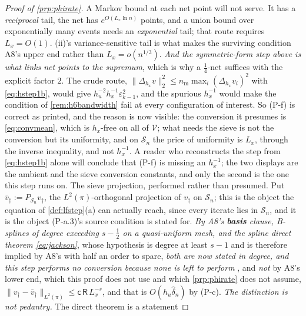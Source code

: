 \begin{proof}[Proof of \cref{prp:phirate}]
A Markov bound at each net point will not serve. It has a \emph{reciprocal} tail, the net has
$e^{O(L_x\ln n)}$ points, and a union bound over
exponentially many events needs an \emph{exponential} tail; that route requires $L_x=O(1)$.
(ii)'s variance-sensitive tail is what makes the surviving condition
A8's upper end rather than $L_x=o(n^{1/3})$. \emph{And the symmetric-form step above is what links net
points to the supremum}, which is why a $\tfrac14$-net suffices with the explicit factor $2$.
The crude route, $\|\Delta_{h_x}v\|_2^{2}\le n_{\mathrm m}\max_i(\Delta_{h_x}v_i)^{2}$ with
\eqref{eq:hstep1b}, would give $h_u^{-2}h_x^{-1}\varepsilon_{k-1}^{2}$, and the spurious $h_x^{-1}$ would
make the condition of \cref{rem:h6bandwidth} fail at every configuration of interest. So (P-f) is
correct as printed, and the reason is now visible: the conversion it presumes is \eqref{eq:convmean},
which is $h_x$-free on all of $\mathcal V$; what needs the sieve is not the conversion but its
uniformity, and on $\mathcal S_n$ the price of uniformity is $L_x$, through the inverse inequality, 
and not $h_x^{-1}$. A reader who reconstructs the step from \eqref{eq:hstep1b} alone will conclude
that (P-f) is missing an $h_x^{-1}$; the two displays are the ambient and the sieve conversion constants,
and only the second is the one this step runs on.
The sieve projection, performed rather than presumed. Put $\bar v_\dagger:=P_{\mathcal S_n}v_\dagger$,
the $L^{2}(\pi)$-orthogonal projection of $v_\dagger$ on $\mathcal S_n$; this is the object the equation
of \cref{def:lfstep}(a) can actually reach, since every iterate lies in $\mathcal S_n$, and it is the
object (P-a.3)'s source condition is stated for. \emph{By A8's \textbf{basis} clause, B-splines of
degree exceeding $s-\tfrac12$ on a quasi-uniform mesh, and the spline direct theorem \eqref{eq:jackson}},
whose hypothesis is degree at least $s-1$ and is therefore implied by A8's with half an order to spare, 
\emph{both are now stated in degree, and this step performs no conversion because none is left to perform}
, and \emph{not} by A8's lower end, which this proof does not use and which \cref{prp:phirate} does not
assume,
$\|v_\dagger-\bar v_\dagger\|_{L^{2}(\pi)}\le\mathsf c\,\mathsf R\,L_x^{-s}$, and that is
$O(h_u\hat\delta_n)$ by (P-c). \emph{The distinction is not pedantry.} The direct theorem is a statement

\end{proof}
